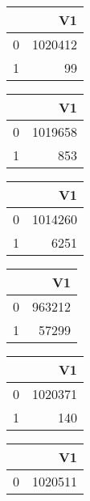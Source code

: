 \bigskip\bigskip
\centering
\begin{tabular}{rr}
  \hline
 & V1 \\ 
  \hline
0 & 1020412 \\ 
  1 &  99 \\ 
   \hline
\end{tabular}

\bigskip\bigskip
\centering
\begin{tabular}{rr}
  \hline
 & V1 \\ 
  \hline
0 & 1019658 \\ 
  1 & 853 \\ 
   \hline
\end{tabular}

\bigskip\bigskip
\centering
\begin{tabular}{rr}
  \hline
 & V1 \\ 
  \hline
0 & 1014260 \\ 
  1 & 6251 \\ 
   \hline
\end{tabular}

\bigskip\bigskip
\centering
\begin{tabular}{rr}
  \hline
 & V1 \\ 
  \hline
0 & 963212 \\ 
  1 & 57299 \\ 
   \hline
\end{tabular}

\bigskip\bigskip
\centering
\begin{tabular}{rr}
  \hline
 & V1 \\ 
  \hline
0 & 1020371 \\ 
  1 & 140 \\ 
   \hline
\end{tabular}

\bigskip\bigskip
\centering
\begin{tabular}{rr}
  \hline
 & V1 \\ 
  \hline
0 & 1020511 \\ 
   \hline
\end{tabular}

